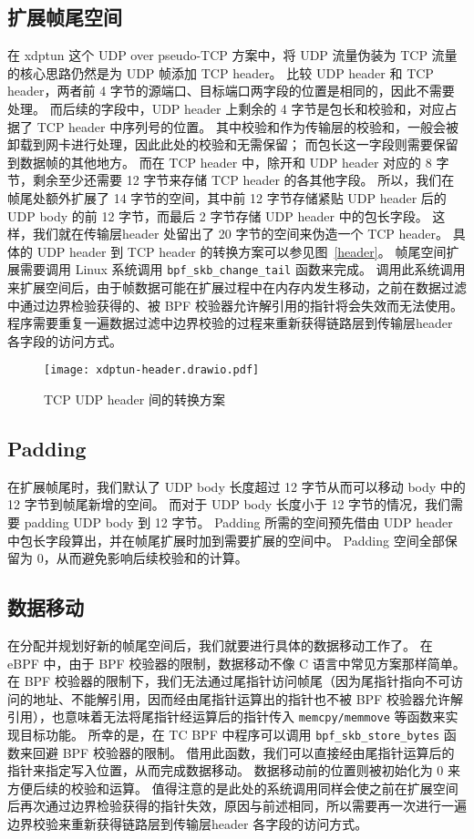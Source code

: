 \subsection{扩展帧尾空间}

在 xdptun 这个 UDP over pseudo-TCP 方案中，将 UDP 流量伪装为 TCP 流量的核心思路仍然是为 UDP 帧添加 TCP header。
比较 UDP header 和 TCP header，两者前 4 字节的源端口、目标端口两字段的位置是相同的，因此不需要处理。
而后续的字段中，UDP header 上剩余的 4 字节是包长和校验和，对应占据了 TCP header 中序列号的位置。
其中校验和作为传输层的校验和，一般会被卸载到网卡进行处理，因此此处的校验和无需保留；
而包长这一字段则需要保留到数据帧的其他地方。
而在 TCP header 中，除开和 UDP header 对应的 8 字节，剩余至少还需要 12 字节来存储 TCP header 的各其他字段。
所以，我们在帧尾处额外扩展了 14 字节的空间，其中前 12 字节存储紧贴 UDP header 后的 UDP body 的前 12 字节，而最后 2 字节存储 UDP header 中的包长字段。
这样，我们就在传输层header 处留出了 20 字节的空间来伪造一个 TCP header。
具体的 UDP header 到 TCP header 的转换方案可以参见图~\ref{header}。
帧尾空间扩展需要调用 Linux 系统调用 \texttt{bpf\_skb\_change\_tail} 函数来完成。
调用此系统调用来扩展空间后，由于帧数据可能在扩展过程中在内存内发生移动，之前在数据过滤中通过边界检验获得的、被 BPF 校验器允许解引用的指针将会失效而无法使用。
程序需要重复一遍数据过滤中边界校验的过程来重新获得链路层到传输层header 各字段的访问方式。

\begin{figure}[h]
  \centering
  \texttt{[image: xdptun-header.drawio.pdf]}
  \caption{TCP UDP header 间的转换方案}
  \label{fig:header}
\end{figure}

\subsection{Padding}

在扩展帧尾时，我们默认了 UDP body 长度超过 12 字节从而可以移动 body 中的 12 字节到帧尾新增的空间。
而对于 UDP body 长度小于 12 字节的情况，我们需要 padding UDP body 到 12 字节。
Padding 所需的空间预先借由 UDP header 中包长字段算出，并在帧尾扩展时加到需要扩展的空间中。
Padding 空间全部保留为 0，从而避免影响后续校验和的计算。

\subsection{数据移动}

在分配并规划好新的帧尾空间后，我们就要进行具体的数据移动工作了。
在 eBPF 中，由于 BPF 校验器的限制，数据移动不像 C 语言中常见方案那样简单。
在 BPF 校验器的限制下，我们无法通过尾指针访问帧尾（因为尾指针指向不可访问的地址、不能解引用，因而经由尾指针运算出的指针也不被 BPF 校验器允许解引用），也意味着无法将尾指针经运算后的指针传入 \texttt{memcpy/memmove} 等函数来实现目标功能。
所幸的是，在 TC BPF 中程序可以调用 \texttt{bpf\_skb\_store\_bytes} 函数来回避 BPF 校验器的限制。
借用此函数，我们可以直接经由尾指针运算后的指针来指定写入位置，从而完成数据移动。
数据移动前的位置则被初始化为 0 来方便后续的校验和运算。
值得注意的是此处的系统调用同样会使之前在扩展空间后再次通过边界检验获得的指针失效，原因与前述相同，所以需要再一次进行一遍边界校验来重新获得链路层到传输层header 各字段的访问方式。

